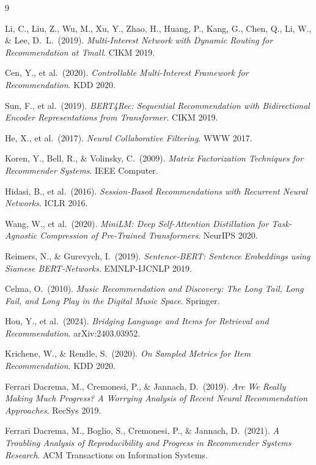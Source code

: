 \documentclass{article}
\begin{document}

\begin{thebibliography}{9}

Li, C., Liu, Z., Wu, M., Xu, Y., Zhao, H., Huang, P., Kang, G., Chen, Q., Li, W., \& Lee, D.\ L.\ (2019).
\textit{Multi-Interest Network with Dynamic Routing for Recommendation at Tmall}. CIKM 2019.

Cen, Y., et al.\ (2020).
\textit{Controllable Multi-Interest Framework for Recommendation}. KDD 2020.

Sun, F., et al.\ (2019).
\textit{BERT4Rec: Sequential Recommendation with Bidirectional Encoder Representations from Transformer}. CIKM 2019.

He, X., et al.\ (2017).
\textit{Neural Collaborative Filtering}. WWW 2017.

Koren, Y., Bell, R., \& Volinsky, C.\ (2009).
\textit{Matrix Factorization Techniques for Recommender Systems}. IEEE Computer.

Hidasi, B., et al.\ (2016).
\textit{Session-Based Recommendations with Recurrent Neural Networks}. ICLR 2016.

Wang, W., et al.\ (2020).
\textit{MiniLM: Deep Self-Attention Distillation for Task-Agnostic Compression of Pre-Trained Transformers}. NeurIPS 2020.

Reimers, N., \& Gurevych, I.\ (2019).
\textit{Sentence-BERT: Sentence Embeddings using Siamese BERT-Networks}. EMNLP-IJCNLP 2019.

Celma, O.\ (2010).
\textit{Music Recommendation and Discovery: The Long Tail, Long Fail, and Long Play in the Digital Music Space}. Springer.

Hou, Y., et al.\ (2024).
\textit{Bridging Language and Items for Retrieval and Recommendation}. arXiv:2403.03952.

Krichene, W., \& Rendle, S.\ (2020).
\textit{On Sampled Metrics for Item Recommendation}. KDD 2020.

Ferrari Dacrema, M., Cremonesi, P., \& Jannach, D.\ (2019).
\textit{Are We Really Making Much Progress? A Worrying Analysis of Recent Neural Recommendation Approaches}. RecSys 2019.

Ferrari Dacrema, M., Boglio, S., Cremonesi, P., \& Jannach, D.\ (2021).
\textit{A Troubling Analysis of Reproducibility and Progress in Recommender Systems Research}. ACM Transactions on Information Systems.


\end{thebibliography}
\end{document}
